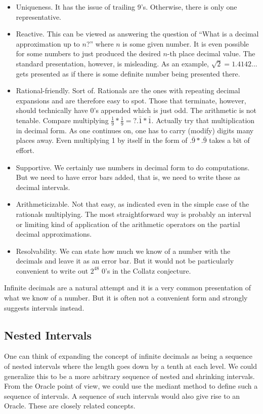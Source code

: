 \documentclass[12pt]{article}
\theoremstyle{remark}
\begin{document}
\begin{itemize}
    \item Uniqueness. It has the issue of trailing 9's. Otherwise, there is only one representative. 
    \item Reactive. This can be viewed as answering the question of ``What is a decimal approximation up to $n$?'' where $n$ is some given number. It is even possible for some numbers to just produced the desired $n$-th place decimal value. The standard presentation, however, is misleading. As an example, $\sqrt{2} = 1.4142...$ gets presented as if there is some definite number being presented there. 
    \item Rational-friendly. Sort of. Rationals are the ones with repeating decimal expansions and are therefore easy to spot. Those that terminate, however, should technically have 0's appended which is just odd. The arithmetic is not tenable. Compare multiplying $\tfrac{1}{9}*\tfrac{1}{9} =? .\bar{1} * \bar{1}$. Actually try that multiplication in decimal form. As one continues on, one has to carry (modify) digits many places away. Even multiplying 1 by itself in the form of $.\bar{9}*.\bar{9}$ takes a bit of effort. 
    \item Supportive. We certainly use numbers in decimal form to do computations. But we need to have error bars added, that is, we need to write these as decimal intervals. 
    \item Arithmeticizable. Not that easy, as indicated even in the simple case of the rationals multiplying. The most straightforward way is probably an interval or limiting kind of application of the arithmetic operators on the partial decimal approximations. 
    \item Resolvability. We can state how much we know of a number with the decimals and leave it as an error bar. But it would not be particularly convenient to write out $2^48$ 0's in the Collatz conjecture. 
\end{itemize}

Infinite decimals are a natural attempt and it is a very common presentation of what we know of a number. But it is often not a convenient form and strongly suggests intervals instead. 

\subsection{Nested Intervals}

One can think of expanding the concept of infinite decimals as being a sequence of nested intervals where the length goes down by a tenth at each level. We could generalize this to be a more arbitrary sequence of nested and shrinking intervals. From the Oracle point of view, we could use the mediant method to define such a sequence of intervals. A sequence of such intervals would also give rise to an Oracle. These are closely related concepts. 
\end{document}
